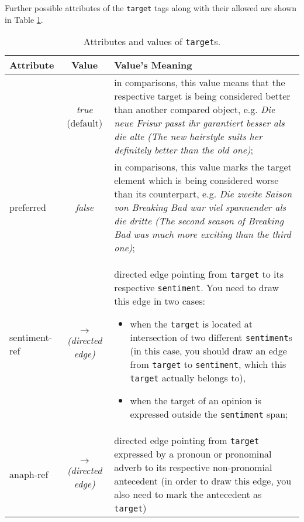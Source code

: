 \documentclass[11pt,a4paper]{article}
\newlength{\clmnwidth}
\theoremstyle{mytheoremstyle}
\begin{document}
Further possible attributes of the \texttt{target} tags along with
their allowed are shown in Table \ref{tbl:target}.
\begin{center}
  \begin{table}[h]
    \caption{Attributes and values of \texttt{target}s.}
    \begin{tabular}{|l|c|p{0.94\clmnwidth}|}\hline
      Attribute & Value & Value's Meaning\\\hline

      & \textit{true} (default) & in comparisons, this value means that
      the respective target is being considered better than another
      compared object, e.g. \textit{\emph{Die neue Frisur} passt ihr
        garantiert besser als die alte (\emph{The new hairstyle} suits
        her definitely better than the old one)};\\\cline{2-3}

      \multirow{-2}{*}{preferred} & \textit{false} & in comparisons,
      this value marks the target element which is being considered
      worse than its counterpart, e.g. \textit{Die zweite Saison von
        Breaking Bad war viel spannender als \emph{die dritte} (The
        second season of Breaking Bad was much more exciting than
        \emph{the third one})};\\\hline

      sentiment-ref & \textit{$\longrightarrow$\newline(directed
        edge)} & directed edge pointing from \texttt{target} to its
      respective \texttt{sentiment}.  You need to draw this edge in
      two cases:
      \begin{itemize}
      \item when the \texttt{target} is located at intersection of two
        different \texttt{sentiment}s (in this case, you should draw
        an edge from \texttt{target} to \texttt{sentiment}, which this
        \texttt{target} actually belongs to),

      \item when the target of an opinion is expressed outside the
        \texttt{sentiment} span;
      \end{itemize}\\\hline

      anaph-ref & \textit{$\longrightarrow$\newline(directed edge)} &
      directed edge pointing from \texttt{target} expressed by a
      pronoun or pronominal adverb to its respective non-pronomial
      antecedent (in order to draw this edge, you also need to mark
      the antecedent as \texttt{target})\\\hline
    \end{tabular}
    \label{tbl:target}
  \end{table}
\end{center}
\end{document}
